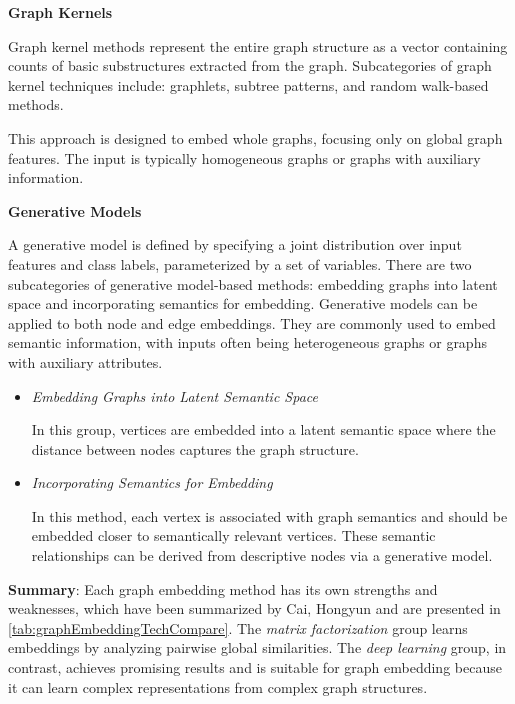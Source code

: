 \textbf{Graph Kernels}

Graph kernel methods represent the entire graph structure as a vector containing counts of basic substructures extracted from the graph. Subcategories of graph kernel techniques include: graphlets, subtree patterns, and random walk-based methods.

This approach is designed to embed whole graphs, focusing only on global graph features. The input is typically homogeneous graphs or graphs with auxiliary information.

\textbf{Generative Models}

A generative model is defined by specifying a joint distribution over input features and class labels, parameterized by a set of variables. There are two subcategories of generative model-based methods: embedding graphs into latent space and incorporating semantics for embedding. Generative models can be applied to both node and edge embeddings. They are commonly used to embed semantic information, with inputs often being heterogeneous graphs or graphs with auxiliary attributes.

\begin{itemize}
	\item \textit{Embedding Graphs into Latent Semantic Space}
	
	In this group, vertices are embedded into a latent semantic space where the distance between nodes captures the graph structure.
	
	\item \textit{Incorporating Semantics for Embedding}
	
	In this method, each vertex is associated with graph semantics and should be embedded closer to semantically relevant vertices. These semantic relationships can be derived from descriptive nodes via a generative model.
\end{itemize}

\textbf{Summary}: Each graph embedding method has its own strengths and weaknesses, which have been summarized by Cai, Hongyun \cite{cai2018comprehensive} and are presented in \autoref{tab:graphEmbeddingTechCompare}. The \textit{matrix factorization} group learns embeddings by analyzing pairwise global similarities. The \textit{deep learning} group, in contrast, achieves promising results and is suitable for graph embedding because it can learn complex representations from complex graph structures.

